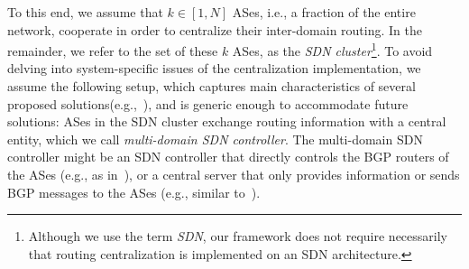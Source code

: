 

To this end, we assume that $k\in[1,N]$ ASes, i.e., a fraction of the entire network, cooperate in order to centralize their inter-domain routing. In the remainder, we refer to the set of these $k$ ASes, as the \textit{SDN cluster}\footnote{Although we use the term \textit{SDN}, our framework does not require necessarily that routing centralization is implemented on an SDN architecture.}. To avoid delving into system-specific issues of the centralization implementation, we assume the following setup, which captures main characteristics of several proposed solutions(e.g.,~\cite{Kotronis-Routing-Centralization-ComNets-2015,Rothenberg-Revisiting-RCP-HotSDN-2012,fibbing-sigcomm-2015}), and is generic enough to accommodate future solutions: ASes in the SDN cluster exchange routing information with a central entity, which we call \textit{multi-domain SDN controller}. The multi-domain SDN controller might be an SDN controller that directly controls the BGP routers of the ASes (e.g., as in~\cite{Kotronis-Routing-Centralization-ComNets-2015}), or a central server that only provides information or sends BGP messages to the ASes (e.g., similar to~\cite{fibbing-sigcomm-2015}). %







